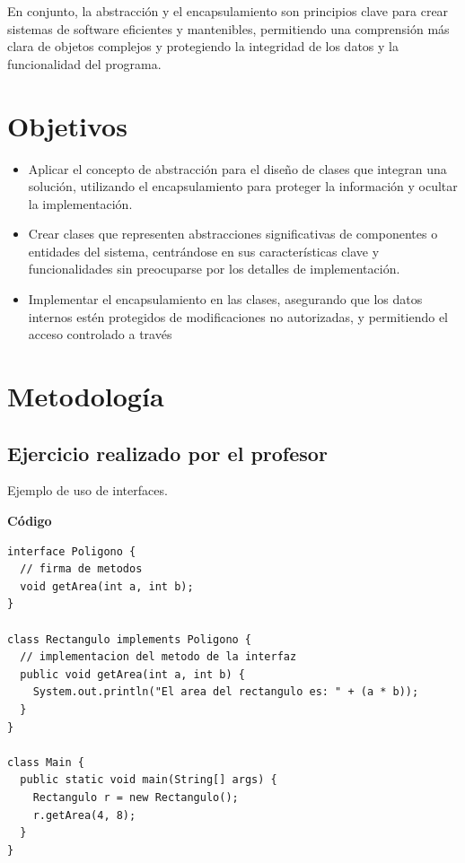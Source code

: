 \documentclass[11pt, twocolumn]{article}
\begin{document}
  En conjunto, la abstracción y el encapsulamiento son principios clave para crear sistemas de software eficientes y mantenibles, permitiendo una comprensión más clara de objetos complejos y protegiendo la integridad de los datos y la funcionalidad del programa.

  \section*{Objetivos}
  \begin{itemize}
    \item Aplicar el concepto de abstracción para el diseño de clases que integran una solución, utilizando el encapsulamiento para proteger la información y ocultar la implementación.
    \item Crear clases que representen abstracciones significativas de componentes o entidades del sistema, centrándose en sus características clave y funcionalidades sin preocuparse por los detalles de implementación.
    \item Implementar el encapsulamiento en las clases, asegurando que los datos internos estén protegidos de modificaciones no autorizadas, y permitiendo el acceso controlado a través 
  \end{itemize}

  \section*{Metodología} 
  \subsection*{Ejercicio realizado por el profesor}
  Ejemplo de uso de interfaces. 

  \textbf{Código}
  \begin{lstlisting}
interface Poligono {
  // firma de metodos
  void getArea(int a, int b);
}  

class Rectangulo implements Poligono {
  // implementacion del metodo de la interfaz
  public void getArea(int a, int b) {
    System.out.println("El area del rectangulo es: " + (a * b));
  }
}

class Main {
  public static void main(String[] args) {
    Rectangulo r = new Rectangulo();
    r.getArea(4, 8);
  }
}  
  \end{lstlisting}
\end{document}
